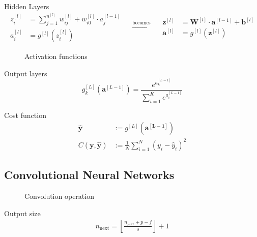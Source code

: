 \begin{frame}
  \begin{block}{Hidden Layers}
    \begin{equation*}
      \begin{aligned}
        z_i^{[l]} &= \sum_{j = 1}^{n^{[l]}} w_{ij}^{[l]} + w_{i0}^{[l]} \cdot a_j^{[l - 1]} \\
        a_i^{[l]} &= g^{[l]}(z_i^{[l]})
      \end{aligned}
      \quad
      \xrightarrow{\text{becomes}}
      \quad
      \begin{aligned}
        \bm{z}^{[l]} &= \bm{W}^{[l]} \cdot \bm{a}^{[l - 1]} + \bm{b}^{[l]} \\
        \bm{a}^{[l]} &= g^{[l]}(\bm{z}^{[l]})
      \end{aligned}
    \end{equation*}
  
  \end{block}
  \begin{figure}
    \centering
    
  
    \caption[Activation functions]{
      Activation functions
    }
  \end{figure}
\end{frame}

\begin{frame}
  \begin{block}{Output layers}
    \[
      g_k^{[L]}(\bm{a}^{[L - 1]}) = \frac{e^{a_k^{[L - 1]}}}{\sum_{i = 1}^K e^{a_i^{[L - 1]}}}
    \]
  \end{block}
  
  \begin{block}{Cost function}
    \begin{align*}
      \hat{\bm{y}} &:= g^{[L]}(\bm{a^{[L - 1]}}) \\
      C(\bm{y}, \hat{\bm{y}}) &:= \frac{1}{N} \sum_{i = 1}^N (y_i - \hat{y}_i)^2
    \end{align*}
  \end{block}
\end{frame}

\subsection{Convolutional Neural Networks}

\begin{frame}{\insertsubsec}
  \centering
  \begin{figure}
    \hspace{-7cm}

    \caption{Convolution operation}
  \end{figure}

  \begin{block}{Output size}
    \begin{align*}
      n_{\text{next}} = \left\lfloor\frac{n_{\text{prev}} + p - f}{s}\right\rfloor + 1
    \end{align*}
  \end{block} 
\end{frame}

